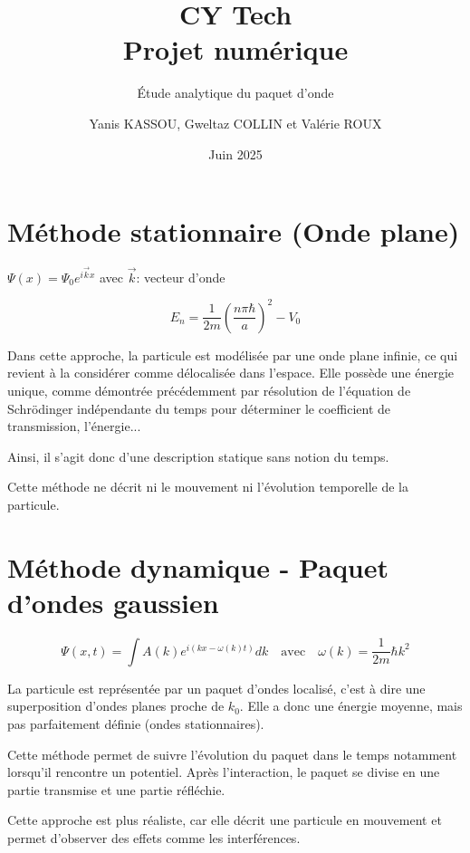 \documentclass[12pt,a4paper]{article}
\date{Juin 2025}
\title{\textbf{CY Tech
\\{\Large Projet numérique}}}
\subtitle{Étude analytique du paquet d'onde}
\author{Yanis KASSOU, Gweltaz COLLIN et Valérie ROUX}
\begin{document}
\maketitle

\section{Méthode stationnaire (Onde plane)}

$\Psi(x) = \Psi_0 e^{i\vec{k}x}$ avec $\vec{k}$: vecteur d'onde

\[E_n = \frac{1}{2m}\left(\frac{n\pi\hbar}{a}\right)^2 - V_0\]

Dans cette approche, la particule est modélisée par une onde plane infinie, ce qui revient à la considérer comme délocalisée dans l'espace. Elle possède une énergie unique, comme démontrée précédemment par résolution de l'équation de Schrödinger indépendante du temps pour déterminer le coefficient de transmission, l'énergie...

Ainsi, il s'agit donc d'une description statique sans notion du temps.

Cette méthode ne décrit ni le mouvement ni l'évolution temporelle de la particule.

\section{Méthode dynamique - Paquet d'ondes gaussien}

\[\Psi(x,t) = \int A(k) e^{i(kx-\omega(k)t)} dk \quad \text{avec} \quad \omega(k) = \frac{1}{2m}\hbar k^2\]

La particule est représentée par un paquet d'ondes localisé, c'est à dire une superposition d'ondes planes proche de $k_0$. Elle a donc une énergie moyenne, mais pas parfaitement définie (ondes stationnaires).

Cette méthode permet de suivre l'évolution du paquet dans le temps notamment lorsqu'il rencontre un potentiel.
Après l'interaction, le paquet se divise en une partie transmise et une partie réfléchie.

Cette approche est plus réaliste, car elle décrit une particule en mouvement et permet d'observer des effets comme les interférences.
\end{document}
